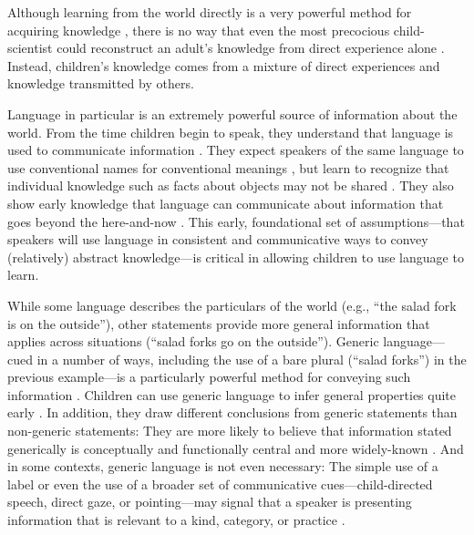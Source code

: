 \documentclass[man]{apa2}
\begin{document}
Although learning from the world directly is a very powerful method for acquiring knowledge \cite{gopnik2012b}, there is no way that even the most precocious child-scientist could reconstruct an adult's knowledge from direct experience alone \cite{shafto2012,harris2012}. Instead, children's knowledge comes from a mixture of direct experiences and knowledge transmitted by others. 

Language in particular is an extremely powerful source of information about the world. From the time children begin to speak, they understand that language is used to communicate information \cite{vouloumanos2012,martin2012}. They expect speakers of the same language to use conventional names for conventional meanings \cite{clark1987, markman1988, diesendruck2005}, but learn to recognize that individual knowledge such as facts about objects may not be shared \cite{diesendruck2001}. They also show early knowledge that language can communicate about information that goes beyond the here-and-now \cite{saylor2007,ganea2007}. This early, foundational set of assumptions---that speakers will use language in consistent and communicative ways to convey (relatively) abstract knowledge---is critical in allowing children to use language to learn. 

While some language describes the particulars of the world (e.g., ``the salad fork is on the outside''), other statements provide more general information that applies across situations (``salad forks go on the outside''). Generic language---cued in a number of ways, including the use of a bare plural (``salad forks'') in the previous example---is a particularly powerful method for conveying such information \cite{leslie2008}. Children can use generic language to infer general properties quite early \cite{gelman2003}. In addition, they draw different conclusions  from generic statements than non-generic statements: They are more likely to believe that information stated generically is  conceptually and functionally central and more widely-known \cite{cimpian2009, cimpian2010, cimpian2012}. And in some contexts, generic language is not even necessary: The simple use of a label or even the use of a broader set of communicative cues---child-directed speech, direct gaze, or pointing---may signal that a speaker is presenting information that is relevant to a kind, category, or practice \cite{csibra2009, butler2012}. 
\end{document}
